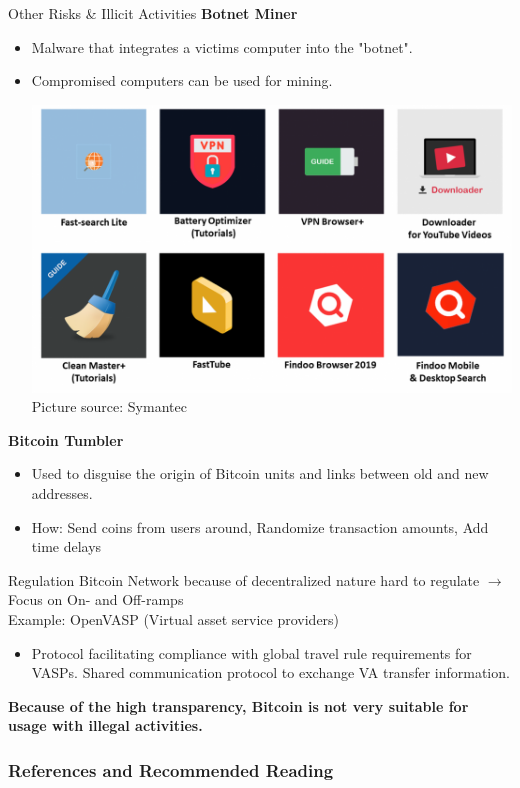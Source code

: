 \documentclass[handout]{beamer}
\begin{document}
\begin{frame}{Other Risks \& Illicit Activities}
	\textbf{Botnet Miner}
		\begin{itemize}
			\item Malware that integrates a victims computer into the "botnet".
			\item Compromised computers can be used for mining.
		\begin{center}
		\includegraphics[scale=0.2]{../assets/images/microsoft_store}\\
		\footnotesize{Picture source: Symantec}
		\end{center}
		\end{itemize}
	\textbf{Bitcoin Tumbler}
		\begin{itemize}
			\item Used to disguise the origin of Bitcoin units and links between old and new addresses.
			\item How: Send coins from users around, Randomize transaction amounts, Add time delays
		\end{itemize}	
\end{frame}


\begin{frame}{Regulation}
	Bitcoin Network because of decentralized nature hard to regulate $\rightarrow$ Focus on On- and Off-ramps\\
	\vspace{1em}
	Example: {\color{focus} OpenVASP } (Virtual asset service providers)
		\begin{itemize}
			\item Protocol facilitating compliance with global travel rule requirements for VASPs. Shared communication protocol to exchange VA transfer information.
		\end{itemize}
	\vspace{1em}
	\textbf{Because of the high transparency, Bitcoin is not very suitable for usage with illegal activities.}
\end{frame}

\begin{frame}%
\frametitle{References and Recommended Reading}
	
	
\end{frame}
\end{document}
